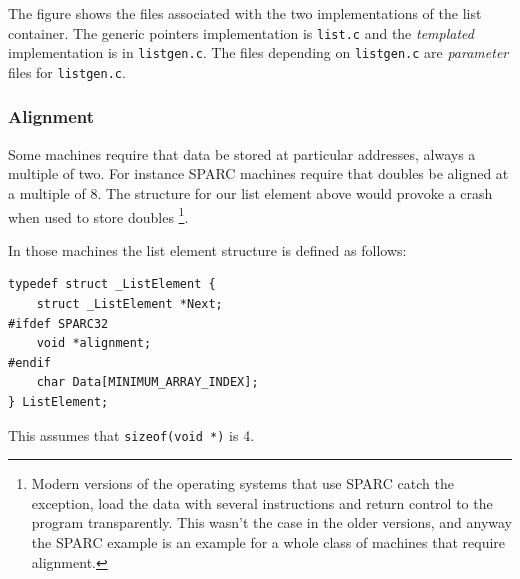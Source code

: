 \documentclass[12pt,a4paper]{memoir} %
\begin{document}
{{The figure shows the files associated with the two implementations of the list container. The generic pointers implementation is \verb,list.c, and the 
\textsl{templated} implementation is in \verb,listgen.c,. The files depending on \verb,listgen.c, are \textsl{parameter} files for \verb,listgen.c,.
\subsubsection{Alignment}
Some machines require that data be stored at particular addresses, always a multiple of two. For instance SPARC machines require that doubles be
aligned at a multiple of 8. The structure for our list element above would provoke a crash when used to store doubles
\footnote{Modern versions of the operating systems that use SPARC catch the exception, load the data with several instructions and return control
to the program transparently. This wasn't the case in the older versions, and anyway the SPARC example is an example for a whole class of machines
that require alignment.}. 

In those machines the list element structure is defined as follows:
\begin{verbatim}
typedef struct _ListElement {
    struct _ListElement *Next;
#ifdef SPARC32
    void *alignment;
#endif
    char Data[MINIMUM_ARRAY_INDEX];
} ListElement;
\end{verbatim}

This assumes that \verb,sizeof(void *), is 4. 

}}
\end{document}
